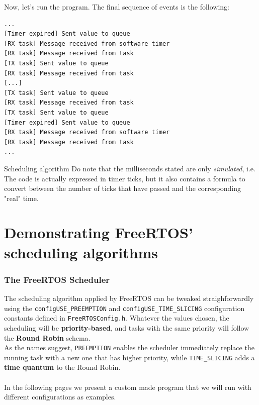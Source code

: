 \documentclass[10pt]{article}
\begin{document}
Now, let's run the program. The final sequence of events is the following:
\begin{lstlisting}
...
[Timer expired] Sent value to queue
[RX task] Message received from software timer
[RX task] Message received from task
[TX task] Sent value to queue
[RX task] Message received from task
[...]
[TX task] Sent value to queue
[RX task] Message received from task
[TX task] Sent value to queue
[Timer expired] Sent value to queue
[RX task] Message received from software timer
[RX task] Message received from task
...
\end{lstlisting}

\begin{example}{Scheduling algorithm}
Do note that the milliseconds stated are only \textit{simulated}, i.e. The code is actually expressed in timer ticks, but it also contains a formula to convert between the number of ticks that have passed and the corresponding "real" time. 
\end{example}

\clearpage
\newpage

\part{Demonstrating FreeRTOS' scheduling algorithms}
\section{The FreeRTOS Scheduler}
The scheduling algorithm applied by FreeRTOS can be tweaked straighforwardly using the \verb|configUSE_PREEMPTION| and \verb|configUSE_TIME_SLICING| configuration constants defined in \verb|FreeRTOSConfig.h|. Whatever the values chosen, the scheduling will be \textbf{priority-based}, and tasks with the same priority will follow the \textbf{Round Robin} schema.\\ As the names suggest, \verb|PREEMPTION| enables the scheduler immediately replace the running task with a new one that has higher priority, while \verb|TIME_SLICING| adds a \textbf{time quantum} to the Round Robin.
\\
\\
In the following pages we present a custom made program that we will run with different configurations as examples.
\end{document}
